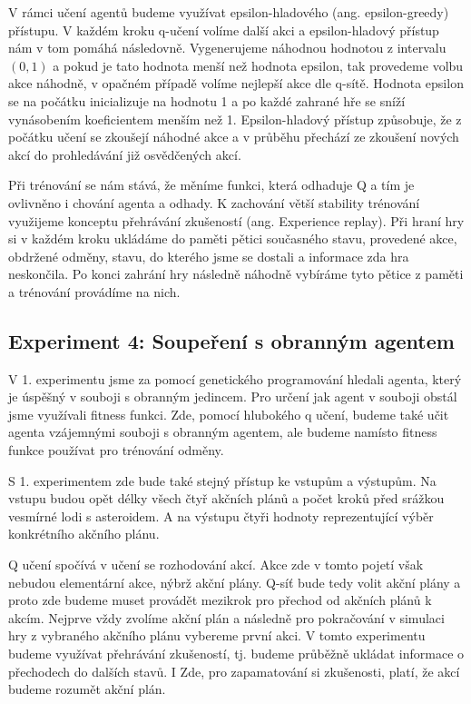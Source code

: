 V rámci učení agentů budeme využívat epsilon-hladového (ang. epsilon-greedy) přístupu. V každém kroku q-učení volíme další akci a epsilon-hladový přístup nám v tom pomáhá následovně.
Vygenerujeme náhodnou hodnotou z intervalu $(0,1)$ a pokud je tato hodnota menší než hodnota epsilon, tak provedeme volbu akce náhodně, v opačném případě volíme nejlepší akce dle q-sítě.
Hodnota epsilon se na počátku inicializuje na hodnotu 1 a po každé zahrané hře se sníží vynásobením koeficientem menším než 1. 
Epsilon-hladový přístup způsobuje, že z počátku učení se zkoušejí náhodné akce a v průběhu přechází ze zkoušení nových akcí do prohledávání již osvědčených akcí.

\par
Při trénování se nám stává, že měníme funkci, která odhaduje Q a tím je ovlivněno i chování agenta a odhady. K zachování větší stability trénování využijeme konceptu přehrávání zkušeností (ang. Experience replay).
Při hraní hry si v každém kroku ukládáme do paměti pětici současného stavu, provedené akce, obdržené odměny, stavu, do kterého jsme se dostali a informace zda hra neskončila.
Po konci zahrání hry následně náhodně vybíráme tyto pětice z paměti a trénování provádíme na nich.






\subsection{Experiment 4: Soupeření s obranným agentem}
V 1. experimentu jsme za pomocí genetického programování hledali agenta, který je úspěšný v souboji s obranným jedincem. Pro určení jak agent v souboji obstál jsme využívali fitness funkci.
Zde, pomocí hlubokého q učení, budeme také učit agenta vzájemnými souboji s obranným agentem, ale budeme namísto fitness funkce používat pro trénování odměny.

S 1. experimentem zde bude také stejný přístup ke vstupům a výstupům. 
Na vstupu budou opět délky všech čtyř akčních plánů a počet kroků před srážkou vesmírné lodi s asteroidem.
A na výstupu čtyři hodnoty reprezentující výběr konkrétního akčního plánu.

Q učení spočívá v učení se rozhodování akcí. Akce zde v tomto pojetí však nebudou elementární akce, nýbrž akční plány. 
Q-síť bude tedy volit akční plány a proto zde budeme muset provádět mezikrok pro přechod od akčních plánů k akcím.
Nejprve vždy zvolíme akční plán a následně pro pokračování v simulaci hry z vybraného akčního plánu vybereme první akci.
V tomto experimentu budeme využívat přehrávání zkušeností, tj. budeme průběžně ukládat informace o přechodech do dalších stavů. 
I Zde, pro zapamatování si zkušenosti, platí, že akcí budeme rozumět akční plán.


